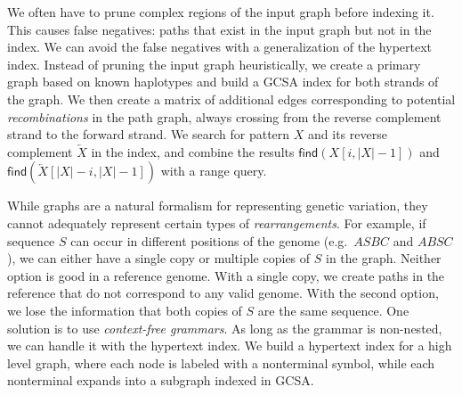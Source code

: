 \documentclass[twoside,leqno,twocolumn]{article}
\newcommand{\abs}[1]{\ensuremath{\lvert #1 \rvert}}
\newcommand{\revcomp}[1]{\ensuremath{\overleftarrow{#1}}}
\newcommand{\find}{\ensuremath{\mathsf{find}}}
\begin{document}
We often have to prune complex regions of the input graph before indexing it. This causes false negatives: paths that exist in the input graph but not in the index. We can avoid the false negatives with a generalization of the hypertext index. Instead of pruning the input graph heuristically, we create a primary graph based on known haplotypes and build a GCSA index for both strands of the graph. We then create a matrix of additional edges corresponding to potential \emph{recombinations} in the path graph, always crossing from the reverse complement strand to the forward strand. We search for pattern $X$ and its reverse complement $\revcomp{X}$ in the index, and combine the results $\find(X[i, \abs{X}-1])$ and $\find(\revcomp{X}[\abs{X}-i, \abs{X}-1])$ with a range query.

While graphs are a natural formalism for representing genetic variation, they cannot adequately represent certain types of \emph{rearrangements}. For example, if sequence $S$ can occur in different positions of the genome (e.g.~$ASBC$ and $ABSC$), we can either have a single copy or multiple copies of $S$ in the graph. Neither option is good in a reference genome. With a single copy, we create paths in the reference that do not correspond to any valid genome. With the second option, we lose the information that both copies of $S$ are the same sequence. One solution is to use \emph{context-free grammars}. As long as the grammar is non-nested, we can handle it with the hypertext index. We build a hypertext index for a high level graph, where each node is labeled with a nonterminal symbol, while each nonterminal expands into a subgraph indexed in GCSA.
\end{document}
